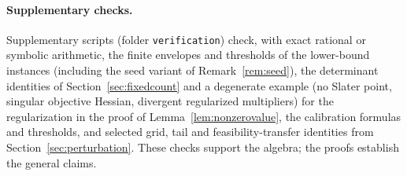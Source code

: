 \paragraph{Supplementary checks.}
Supplementary scripts (folder \texttt{verification}) check, with exact rational or symbolic arithmetic, the finite envelopes
and thresholds of the lower-bound instances (including the seed variant
of Remark~\ref{rem:seed}), the determinant identities of Section~\ref{sec:fixedcount} and a
degenerate example (no Slater point, singular objective Hessian,
divergent regularized multipliers) for the regularization in the proof
of Lemma~\ref{lem:nonzerovalue},
the calibration formulas and thresholds, and selected grid, tail and
feasibility-transfer identities from Section~\ref{sec:perturbation}. These checks support the
algebra; the proofs establish the general claims.
